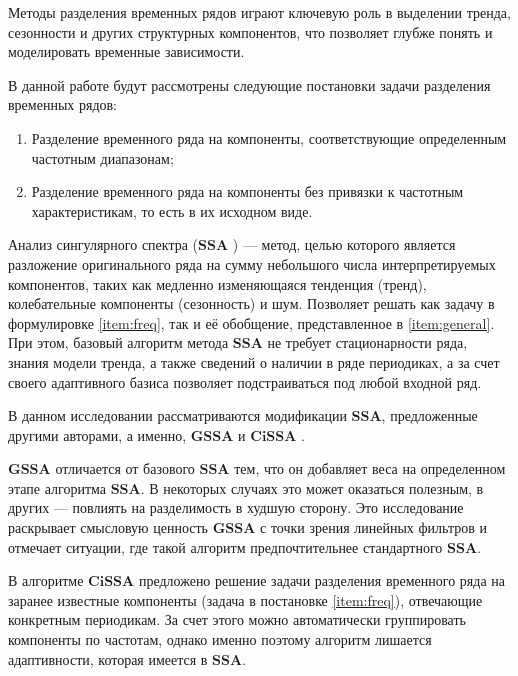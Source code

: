 \documentclass[a4paper, 11pt]{article}
\newcommand{\SSA}{\textbf{SSA}}
\newcommand{\GSSA}{\textbf{GSSA}}
\newcommand{\CISSA}{\textbf{CiSSA}}
\newcommand{\TS}{\mathsf{X}}
\newtheorem{comment}{Замечание} %
\begin{document}

Методы разделения временных рядов играют ключевую роль в выделении тренда, сезонности и других структурных компонентов, что позволяет глубже понять и моделировать временные зависимости.


В данной работе будут рассмотрены следующие постановки задачи разделения временных рядов:
\begin{enumerate}
	\item \label{item:freq} Разделение временного ряда на компоненты, соответствующие определенным частотным диапазонам;
	\item \label{item:general} Разделение временного ряда на компоненты без привязки к частотным характеристикам, то есть в их исходном виде.
\end{enumerate}


Анализ сингулярного спектра ($\SSA$ \cite{golyandina2001analysis}) --- метод, целью которого является разложение оригинального ряда на сумму небольшого числа интерпретируемых компонентов, таких как медленно изменяющаяся тенденция (тренд), колебательные компоненты (сезонность) и шум. Позволяет решать как задачу в формулировке \ref{item:freq}, так и её обобщение, представленное в \ref{item:general}. При этом, базовый алгоритм метода $\SSA$ не требует стационарности ряда, знания модели тренда, а также сведений о наличии в ряде периодиках, а за счет своего адаптивного базиса позволяет подстраиваться под любой входной ряд.

В данном исследовании рассматриваются модификации $\SSA$, предложенные другими авторами, а именно, $\GSSA$ \cite{gu2024generalized} и $\CISSA$ \cite{bogalo2020}. 


$\GSSA$ отличается от базового $\SSA$ тем, что он добавляет веса на определенном этапе алгоритма $\SSA$. В некоторых случаях это может оказаться полезным, в других --- повлиять на разделимость в худшую сторону. 
Это исследование раскрывает смысловую ценность $\GSSA$ с точки зрения линейных фильтров и отмечает ситуации, где такой алгоритм предпочтительнее стандартного $\SSA$.


В алгоритме $\CISSA$ предложено решение задачи разделения временного ряда на заранее известные компоненты (задача в постановке \ref{item:freq}), отвечающие конкретным периодикам. За счет этого можно автоматически группировать компоненты по частотам, однако именно поэтому алгоритм лишается адаптивности, которая имеется в $\SSA$. 
\end{document}
